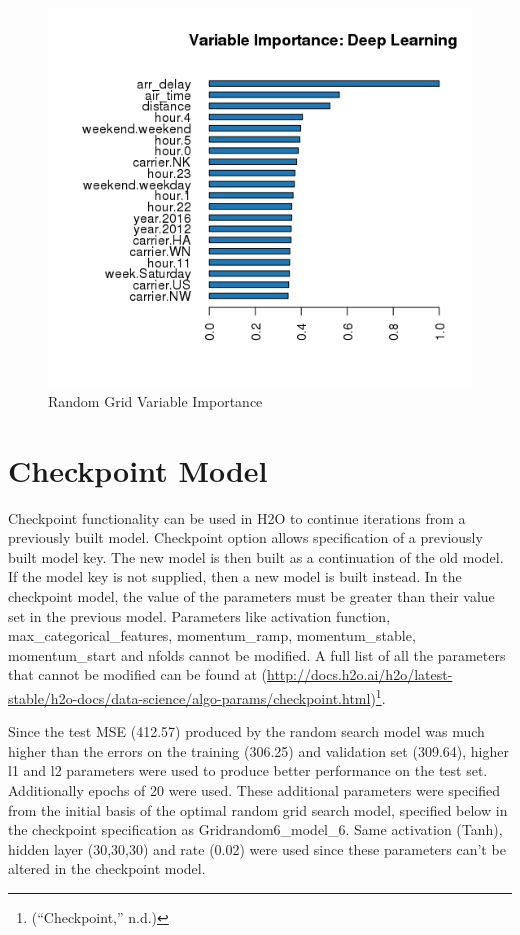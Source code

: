 \documentclass[12pt,twoside]{amherstthesis}
\begin{document}
  \begin{figure}[htbp]
  \centering
  \includegraphics[scale = 1,angle = 0]{figure/VarImportRand-2.png}
  \caption[Random Grid Variable Importance]{\normalsize{Random Grid Variable Importance}}
  \label{fig:Hyarn139}
  \end{figure}
  
  \clearpage 
  
  \section{Checkpoint Model}\label{checkpoint-model}
  
  Checkpoint functionality can be used in H2O to continue iterations from
  a previously built model. Checkpoint option allows specification of a
  previously built model key. The new model is then built as a
  continuation of the old model. If the model key is not supplied, then a
  new model is built instead. In the checkpoint model, the value of the
  parameters must be greater than their value set in the previous model.
  Parameters like activation function, max\_categorical\_features,
  momentum\_ramp, momentum\_stable, momentum\_start and nfolds cannot be
  modified. A full list of all the parameters that cannot be modified can
  be found at
  (\url{http://docs.h2o.ai/h2o/latest-stable/h2o-docs/data-science/algo-params/checkpoint.html})\footnote{(``Checkpoint,''
    n.d.)}.
  
  Since the test MSE (412.57) produced by the random search model was much
  higher than the errors on the training (306.25) and validation set
  (309.64), higher l1 and l2 parameters were used to produce better
  performance on the test set. Additionally epochs of 20 were used. These
  additional parameters were specified from the initial basis of the
  optimal random grid search model, specified below in the checkpoint
  specification as Gridrandom6\_model\_6. Same activation (Tanh), hidden
  layer (30,30,30) and rate (0.02) were used since these parameters can't
  be altered in the checkpoint model.
  
\end{document}
